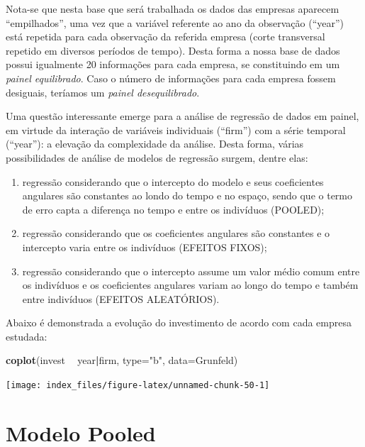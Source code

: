 \documentclass[12pt,brazil,oneside]{book}
\newenvironment{Shaded}{\begin{snugshade}}{\end{snugshade}}
\newcommand{\DataTypeTok}[1]{\textcolor[rgb]{0.13,0.29,0.53}{#1}}
\newcommand{\KeywordTok}[1]{\textcolor[rgb]{0.13,0.29,0.53}{\textbf{#1}}}
\newcommand{\NormalTok}[1]{#1}
\newcommand{\OperatorTok}[1]{\textcolor[rgb]{0.81,0.36,0.00}{\textbf{#1}}}
\newcommand{\StringTok}[1]{\textcolor[rgb]{0.31,0.60,0.02}{#1}}
\begin{document}
Nota-se que nesta base que será trabalhada os dados das empresas aparecem ``empilhados'', uma vez que a variável referente ao ano da observação (``year'') está repetida para cada observação da referida empresa (corte transversal repetido em diversos períodos de tempo). Desta forma a nossa base de dados possui igualmente 20 informações para cada empresa, se constituindo em um \emph{painel equilibrado}. Caso o número de informações para cada empresa fossem desiguais, teríamos um \emph{painel desequilibrado}.

Uma questão interessante emerge para a análise de regressão de dados em painel, em virtude da interação de variáveis individuais (``firm'') com a série temporal (``year''): a elevação da complexidade da análise. Desta forma, várias possibilidades de análise de modelos de regressão surgem, dentre elas:

\begin{enumerate}
\def\labelenumi{\alph{enumi})}
\item
  regressão considerando que o intercepto do modelo e seus coeficientes angulares são constantes ao londo do tempo e no espaço, sendo que o termo de erro capta a diferença no tempo e entre os indivíduos (POOLED);
\item
  regressão considerando que os coeficientes angulares são constantes e o intercepto varia entre os indivíduos (EFEITOS FIXOS);
\item
  regressão considerando que o intercepto assume um valor médio comum entre os indivíduos e os coeficientes angulares variam ao longo do tempo e também entre indivíduos (EFEITOS ALEATÓRIOS).
\end{enumerate}

Abaixo é demonstrada a evolução do investimento de acordo com cada empresa estudada:

\begin{Shaded}
\begin{Highlighting}[]
\KeywordTok{coplot}\NormalTok{(invest }\OperatorTok{~}\StringTok{ }\NormalTok{year}\OperatorTok{|}\NormalTok{firm, }\DataTypeTok{type=}\StringTok{"b"}\NormalTok{, }\DataTypeTok{data=}\NormalTok{Grunfeld)}
\end{Highlighting}
\end{Shaded}

\begin{center}\texttt{[image: index\_files/figure-latex/unnamed-chunk-50-1]} \end{center}

\hypertarget{modelo-pooled}{%
\section{Modelo Pooled}\label{modelo-pooled}}
\end{document}

